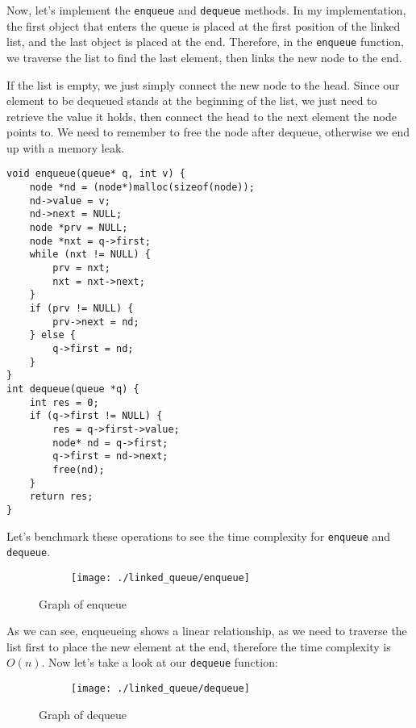 \documentclass[a4paper,11pt]{article}
\begin{document}
    Now, let's implement the {\tt enqueue} and {\tt dequeue} methods.
    In my implementation, the first object that enters the queue is placed at the first position of the linked list, and the last object is placed at the end.
    Therefore, in the {\tt enqueue} function, we traverse the list to find the last element, then links the new node to the end.

    If the list is empty, we just simply connect the new node to the head.
    Since our element to be dequeued stands at the beginning of the list, we just need to retrieve the value it holds, then connect the head to the next element the node points to.
    We need to remember to free the node after dequeue, otherwise we end up with a memory leak.

    \begin{verbatim}
void enqueue(queue* q, int v) {
    node *nd = (node*)malloc(sizeof(node));
    nd->value = v;
    nd->next = NULL;
    node *prv = NULL;
    node *nxt = q->first;
    while (nxt != NULL) {
        prv = nxt;
        nxt = nxt->next;
    }
    if (prv != NULL) {
        prv->next = nd;
    } else {
        q->first = nd;
    }
}
int dequeue(queue *q) {
    int res = 0;
    if (q->first != NULL) {
        res = q->first->value;
        node* nd = q->first;
        q->first = nd->next;
        free(nd);
    }
    return res;
}
    \end{verbatim}

    Let's benchmark these operations to see the time complexity for {\tt enqueue} and {\tt dequeue}.

    \begin{figure}[H]
        \centering
        \begin{subfigure}[b]{.5\textwidth}
            \centering
            \texttt{[image: ./linked\_queue/enqueue]} %
        \end{subfigure}
        \caption{Graph of enqueue}
        \label{fig:graph_1}
    \end{figure}

    As we can see, enqueueing shows a linear relationship, as we need to traverse the list first to place the new element at the end, therefore the time complexity is $O(n)$.
    Now let's take a look at our {\tt dequeue} function:

    \begin{figure}[H]
        \centering
        \begin{subfigure}[b]{.5\textwidth}
            \centering
            \texttt{[image: ./linked\_queue/dequeue]} %
        \end{subfigure}
        \caption{Graph of dequeue}
        \label{fig:graph_2}
    \end{figure}
\end{document}
